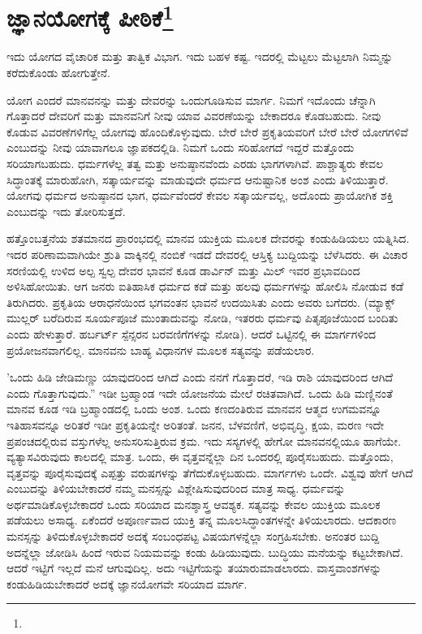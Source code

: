 
\chapter{ಜ್ಞಾನಯೋಗಕ್ಕೆ ಪೀಠಿಕೆ\protect\footnote{}}

ಇದು ಯೋಗದ ವೈಚಾರಿಕ ಮತ್ತು ತಾತ್ವಿಕ ವಿಭಾಗ. ಇದು ಬಹಳ ಕಷ್ಟ. ಇದರಲ್ಲಿ ಮೆಟ್ಟಲು ಮೆಟ್ಟಲಾಗಿ ನಿಮ್ಮನ್ನು ಕರೆದುಕೊಂಡು ಹೋಗುತ್ತೇನೆ.

ಯೋಗ ಎಂದರೆ ಮಾನವನನ್ನು ಮತ್ತು ದೇವರನ್ನು ಒಂದುಗೂಡಿಸುವ ಮಾರ್ಗ. ನಿಮಗೆ ಇದೊಂದು ಚೆನ್ನಾಗಿ ಗೊತ್ತಾದರೆ ದೇವರಿಗೆ ಮತ್ತು ಮಾನವನಿಗೆ ನೀವು ಯಾವ ವಿವರಣೆಯನ್ನು ಬೇಕಾದರೂ ಕೊಡಬಹುದು. ನೀವು ಕೊಡುವ ವಿವರಣೆಗಳಿಗೆಲ್ಲ ಯೋಗವು ಹೊಂದಿಕೊಳ್ಳುವುದು. ಬೇರೆ ಬೇರೆ ಪ್ರಕೃತಿಯವರಿಗೆ ಬೇರೆ ಬೇರೆ ಯೋಗಗಳಿವೆ ಎಂಬುದನ್ನು ನೀವು ಯಾವಾಗಲೂ ಜ್ಞಾಪಕದಲ್ಲಿಡಿ. ನಿಮಗೆ ಒಂದು ಸರಿಹೋಗದೆ ಇದ್ದರೆ ಮತ್ತೊಂದು ಸರಿಯಾಗಬಹುದು. ಧರ್ಮಗಳೆಲ್ಲ ತತ್ವ ಮತ್ತು ಅನುಷ್ಠಾನವೆಂದು ಎರಡು ಭಾಗಗಳಾಗಿವೆ. ಪಾಶ್ಚಾತ್ಯರು ಕೇವಲ ಸಿದ್ಧಾಂತಕ್ಕೆ ಮಾರುಹೋಗಿ, ಸತ್ಕಾರ್ಯವನ್ನು ಮಾಡುವುದೇ ಧರ್ಮದ ಆನುಷ್ಟಾನಿಕ ಅಂಶ ಎಂದು ತಿಳಿಯುತ್ತಾರೆ. ಯೋಗವು ಧರ್ಮದ ಅನುಷ್ಠಾನದ ಭಾಗ, ಧರ್ಮವೆಂದರೆ ಕೇವಲ ಸತ್ಕಾರ್ಯವಲ್ಲ, ಅದೊಂದು ಪ್ರಾಯೋಗಿಕ ಶಕ್ತಿ ಎಂಬುದನ್ನು ಇದು ತೋರಿಸುತ್ತದೆ.

ಹತ್ತೊಂಬತ್ತನೆಯ ಶತಮಾನದ ಪ್ರಾರಂಭದಲ್ಲಿ ಮಾನವ ಯುಕ್ತಿಯ ಮೂಲಕ ದೇವರನ್ನು ಕಂಡುಹಿಡಿಯಲು ಯತ್ನಿಸಿದ. ಇದರ ಪರಿಣಾಮವಾಗಿಯೇ ಶ್ರುತಿ ವಾಕ್ಕಿನಲ್ಲಿ ನಂಬಿಕೆ ಇಡದೆ ದೇವರಲ್ಲಿ ಆಸ್ತಿಕ್ಯ ಬುದ್ದಿಯನ್ನು ಬೆಳೆಸಿದರು. ಈ ವಿಚಾರ ಸರಣಿಯಲ್ಲಿ ಉಳಿದ ಅಲ್ಪ ಸ್ವಲ್ಪ ದೇವರ ಭಾವನೆ ಕೂಡ ಡಾರ್ವಿನ್ ಮತ್ತು ಮಿಲ್ ಇವರ ಪ್ರಭಾವದಿಂದ ಅಳಿಸಿಹೋಯಿತು. ಆಗ ಜನರು ಐತಿಹಾಸಿಕ ಧರ್ಮದ ಕಡೆ ಮತ್ತು ಹಲವು ಧರ್ಮಗಳನ್ನು ಹೋಲಿಸಿ ನೋಡುವ ಕಡೆ ತಿರುಗಿದರು. ಪ್ರಕೃತಿಯ ಆರಾಧನೆಯಿಂದ ಭಗವಂತನ ಭಾವನೆ ಉದಯಿಸಿತು ಎಂದು ಅವರು ಬಗೆದರು. (ಮ್ಯಾಕ್ಸ್ ಮುಲ್ಲರ್ ಬರೆದಿರುವ ಸೂರ್ಯಪೂಜೆ ಮುಂತಾದುವನ್ನು ನೋಡಿ, ಇತರರು ಧರ್ಮವು ಪಿತೃಪೂಜೆಯಿಂದ ಬಂದಿತು ಎಂದು ಹೇಳುತ್ತಾರೆ. ಹರ್ಬರ್ಟ್ ಸ್ಪೆನ್ಸರನ ಬರವಣಿಗೆಗಳನ್ನು ನೋಡಿ). ಆದರೆ ಒಟ್ಟಿನಲ್ಲಿ ಈ ಮಾರ್ಗಗಳಿಂದ ಪ್ರಯೋಜನವಾಗಲಿಲ್ಲ. ಮಾನವನು ಬಾಹ್ಯ ವಿಧಾನಗಳ ಮೂಲಕ ಸತ್ಯವನ್ನು ಪಡೆಯಲಾರ.

'ಒಂದು ಹಿಡಿ ಜೇಡಿಮಣ್ಣು ಯಾವುದರಿಂದ ಆಗಿದೆ ಎಂದು ನನಗೆ ಗೊತ್ತಾದರೆ, ಇಡಿ ರಾಶಿ ಯಾವುದರಿಂದ ಆಗಿದೆ ಎಂದು ಗೊತ್ತಾಗುವುದು.” ಇಡೀ ಬ್ರಹ್ಮಾಂಡ ಇದೇ ಯೋಜನೆಯ ಮೇಲೆ ರಚಿತವಾಗಿದೆ. ಒಂದು ಹಿಡಿ ಮಣ್ಣಿನಂತೆ ಮಾನವ ಕೂಡ ಇಡಿ ಬ್ರಹ್ಮಾಂಡದಲ್ಲಿ ಒಂದು ಅಂಶ. ಒಂದು ಕಣದಂತಿರುವ ಮಾನವನ ಆತ್ಮದ ಉಗಮವನ್ನೂ ಇತಿಹಾಸವನ್ನೂ ಅರಿತರೆ ಇಡೀ ಪ್ರಕೃತಿಯನ್ನೇ ಅರಿತಂತೆ. ಜನನ, ಬೆಳವಣಿಗೆ, ಅಭಿವೃದ್ಧಿ, ಕ್ಷಯ, ಮರಣ ಇದೇ ಪ್ರಪಂಚದಲ್ಲಿರುವ ವಸ್ತುಗಳೆಲ್ಲ ಅನುಸರಿಸುತ್ತಿರುವ ಕ್ರಮ. ಇದು ಸಸ್ಯಗಳಲ್ಲಿ ಹೇಗೋ ಮಾನವನಲ್ಲಿಯೂ ಹಾಗೆಯೇ. ವ್ಯತ್ಯಾಸವಿರುವುದು ಕಾಲದಲ್ಲಿ ಮಾತ್ರ. ಒಂದು, ಈ ವೃತ್ತವನ್ನೆಲ್ಲಾ ದಿನ ಒಂದರಲ್ಲಿ ಪೂರೈಸಬಹುದು. ಮತ್ತೊಂದು, ವೃತ್ತವನ್ನು ಪೂರೈಸುವುದಕ್ಕೆ ಎಪ್ಪತ್ತು ವರುಷಗಳನ್ನು ತೆಗೆದುಕೊಳ್ಳಬಹುದು. ಮಾರ್ಗಗಳು ಒಂದೇ. ವಿಶ್ವವು ಹೇಗೆ ಆಗಿದೆ ಎಂಬುದನ್ನು ತಿಳಿಯಬೇಕಾದರೆ ನಮ್ಮ ಮನಸ್ಸನ್ನು ವಿಶ್ಲೇಷಿಸುವುದರಿಂದ ಮಾತ್ರ ಸಾಧ್ಯ. ಧರ್ಮವನ್ನು ಅರ್ಥಮಾಡಿಕೊಳ್ಳಬೇಕಾದರೆ ಒಂದು ಸರಿಯಾದ ಮನಶ್ಶಾಸ್ತ್ರ ಆವಶ್ಯಕ. ಸತ್ಯವನ್ನು ಕೇವಲ ಯುಕ್ತಿಯ ಮೂಲಕ ಪಡೆಯಲು ಅಸಾಧ್ಯ. ಏಕೆಂದರೆ ಅಪೂರ್ಣವಾದ ಯುಕ್ತಿ ತನ್ನ ಮೂಲಸಿದ್ಧಾಂತಗಳನ್ನೇ ತಿಳಿಯಲಾರದು. ಆದಕಾರಣ ಮನಸ್ಸನ್ನು ತಿಳಿದುಕೊಳ್ಳಬೇಕಾದರೆ ಅದಕ್ಕೆ ಸಂಬಂಧಪಟ್ಟ ವಿಷಯಗಳನ್ನೆಲ್ಲಾ ಸಂಗ್ರಹಿಸಬೇಕು. ಅನಂತರ ಬುದ್ದಿ ಅದನ್ನೆಲ್ಲಾ ಜೋಡಿಸಿ ಹಿಂದೆ ಇರುವ ನಿಯಮವನ್ನು ಕಂಡು ಹಿಡಿಯುವುದು. ಬುದ್ಧಿಯು ಮನೆಯನ್ನು ಕಟ್ಟಬೇಕಾಗಿದೆ. ಆದರೆ ಇಟ್ಟಿಗೆ ಇಲ್ಲದೆ ಮನೆ ಆಗುವುದಿಲ್ಲ. ಅದು ಇಟ್ಟಿಗೆಯನ್ನು ತಯಾರುಮಾಡಲಾರದು. ವಾಸ್ತವಾಂಶಗಳನ್ನು ಕಂಡುಹಿಡಿಯಬೇಕಾದರೆ ಅದಕ್ಕೆ ಜ್ಞಾನಯೋಗವೇ ಸರಿಯಾದ ಮಾರ್ಗ.

